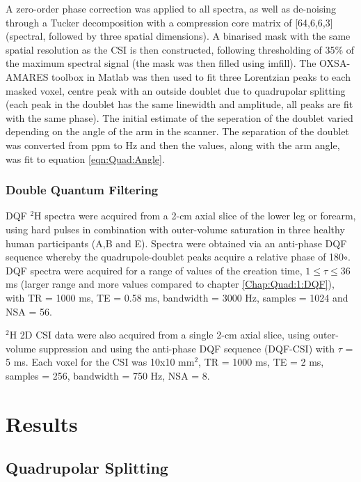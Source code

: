 \documentclass[class=article, crop=false]{standalone}
\begin{document}
A zero-order phase correction was applied to all spectra, as well as de-noising through a Tucker decomposition\cite{Bader2007EfficientTensors} with a compression core matrix of [64,6,6,3] (spectral, followed by three spatial dimensions). A binarised mask with the same spatial resolution as the CSI is then constructed, following thresholding of 35\% of the maximum spectral signal (the mask was then filled using imfill). The OXSA-AMARES toolbox in Matlab was then used to fit three Lorentzian peaks to each masked voxel, centre peak with an outside doublet due to quadrupolar splitting (each peak in the doublet has the same linewidth and amplitude, all peaks are fit with the same phase). The initial estimate of the seperation of the doublet varied depending on the angle of the arm in the scanner. The separation of the doublet was converted from ppm to Hz and then the values, along with the arm angle, was fit to equation \ref{eqn:Quad:Angle}.

\subsubsection{Double Quantum Filtering}

DQF $^2$H spectra were acquired from a 2-cm axial slice of the lower leg or forearm, using hard pulses in combination with outer-volume saturation in three healthy human participants (A,B and E). Spectra were obtained via an anti-phase DQF sequence\cite{Sharf1995DetectionNMR-Spectroscopy} whereby the quadrupole-doublet peaks acquire a relative phase of 180$\circ$. DQF spectra were acquired for a range of values of the creation time, $1\leq\tau\leq36$ ms (larger range and more values compared to chapter \ref{Chap:Quad:1:DQF}), with TR = 1000 ms, TE = 0.58 ms, bandwidth = 3000 Hz, samples = 1024 and NSA = 56.

$^2$H 2D CSI data were also acquired from a single 2-cm axial slice, using outer-volume suppression and using the anti-phase DQF sequence (DQF-CSI) with $\tau$ = 5 ms. Each voxel for the CSI was 10x10 mm$^2$, TR = 1000 ms, TE = 2 ms, samples = 256, bandwidth = 750 Hz, NSA = 8.


\section{Results}

\subsection{Quadrupolar Splitting}
\end{document}
